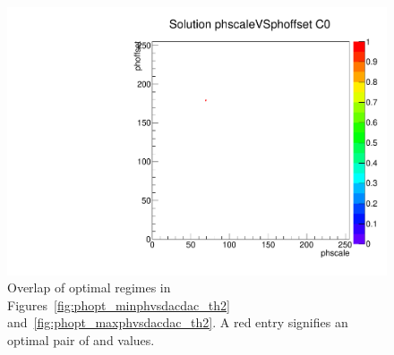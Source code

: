 \begin{figure}[!htp]
\centering
\begin{minipage}{0.45\textwidth}
  \includegraphics[width=1.0\textwidth]{figures/phopt_solphvsdacdac_th2.pdf}
  \caption{Overlap of optimal regimes in Figures~\ref{fig:phopt_minphvsdacdac_th2} and~\ref{fig:phopt_maxphvsdacdac_th2}.
           A red entry signifies an optimal pair of \phoffset and \phscale values.}
  \label{fig:phopt_solphvsdacdac_th2}
\end{minipage}
\end{figure}


